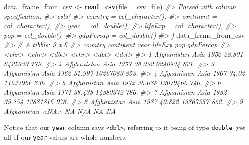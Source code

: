 \documentclass[
]{report}
\newenvironment{Shaded}{\begin{snugshade}}{\end{snugshade}}
\newcommand{\CommentTok}[1]{\textcolor[rgb]{0.56,0.35,0.01}{\textit{#1}}}
\newcommand{\DataTypeTok}[1]{\textcolor[rgb]{0.13,0.29,0.53}{#1}}
\newcommand{\KeywordTok}[1]{\textcolor[rgb]{0.13,0.29,0.53}{\textbf{#1}}}
\newcommand{\NormalTok}[1]{#1}
\newcommand{\OperatorTok}[1]{\textcolor[rgb]{0.81,0.36,0.00}{\textbf{#1}}}
\newcommand{\StringTok}[1]{\textcolor[rgb]{0.31,0.60,0.02}{#1}}
\begin{document}
\begin{Shaded}
\begin{Highlighting}[]
\NormalTok{data\_frame\_from\_csv \textless{}{-}}\StringTok{ }\KeywordTok{read\_csv}\NormalTok{(}\DataTypeTok{file =}\NormalTok{ csv\_file)}
\CommentTok{\#\textgreater{} Parsed with column specification:}
\CommentTok{\#\textgreater{} cols(}
\CommentTok{\#\textgreater{}   country = col\_character(),}
\CommentTok{\#\textgreater{}   continent = col\_character(),}
\CommentTok{\#\textgreater{}   year = col\_double(),}
\CommentTok{\#\textgreater{}   lifeExp = col\_character(),}
\CommentTok{\#\textgreater{}   pop = col\_double(),}
\CommentTok{\#\textgreater{}   gdpPercap = col\_double()}
\CommentTok{\#\textgreater{} )}
\NormalTok{data\_frame\_from\_csv}
\CommentTok{\#\textgreater{} \# A tibble: 9 x 6}
\CommentTok{\#\textgreater{}   country     continent  year lifeExp      pop gdpPercap}
\CommentTok{\#\textgreater{}   \textless{}chr\textgreater{}       \textless{}chr\textgreater{}     \textless{}dbl\textgreater{} \textless{}chr\textgreater{}      \textless{}dbl\textgreater{}     \textless{}dbl\textgreater{}}
\CommentTok{\#\textgreater{} 1 Afghanistan Asia       1952 28.801   8425333      779.}
\CommentTok{\#\textgreater{} 2 Afghanistan Asia       1957 30.332   9240934      821.}
\CommentTok{\#\textgreater{} 3 Afghanistan Asia       1962 31.997  10267083      853.}
\CommentTok{\#\textgreater{} 4 Afghanistan Asia       1967 34.02   11537966      836.}
\CommentTok{\#\textgreater{} 5 Afghanistan Asia       1972 36.088  13079460      740.}
\CommentTok{\#\textgreater{} 6 Afghanistan Asia       1977 38.438  14880372      786.}
\CommentTok{\#\textgreater{} 7 Afghanistan Asia       1982 39.854  12881816      978.}
\CommentTok{\#\textgreater{} 8 Afghanistan Asia       1987 40.822  13867957      852.}
\CommentTok{\#\textgreater{} 9 Afghanistan \textless{}NA\textgreater{}         NA N/A           NA       NA}
\end{Highlighting}
\end{Shaded}

Notice that our \texttt{year} column says \texttt{\textless{}dbl\textgreater{}}, referring to it being of type \texttt{double}, yet all of our \texttt{year} values are whole numbers.

\begin{Shaded}
\end{Shaded}
\end{document}
